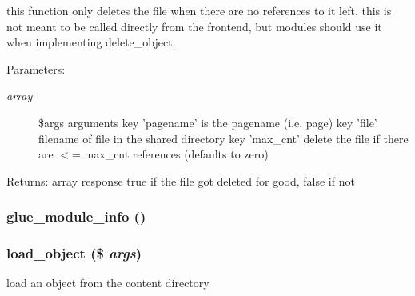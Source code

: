 this function only deletes the file when there are no references to it left. this is not meant to be called directly from the frontend, but modules should use it when implementing delete\_\-object. \begin{Desc}
\item[Parameters:]
\begin{description}
\item[{\em array}]\$args arguments key 'pagename' is the pagename (i.e. page) key 'file' filename of file in the shared directory key 'max\_\-cnt' delete the file if there are $<$= max\_\-cnt references (defaults to zero) \end{description}
\end{Desc}
\begin{Desc}
\item[Returns:]array response true if the file got deleted for good, false if not \end{Desc}
\hypertarget{module__glue_8inc_8php_9b741f04b878cbc03f1aac7d3406d548}{
\subsubsection[{glue\_\-module\_\-info}]{\setlength{\rightskip}{0pt plus 5cm}glue\_\-module\_\-info ()}}
\label{module__glue_8inc_8php_9b741f04b878cbc03f1aac7d3406d548}


\hypertarget{module__glue_8inc_8php_c6b5ed5ff055ccb4d07ad17cf78d5a11}{
\subsubsection[{load\_\-object}]{\setlength{\rightskip}{0pt plus 5cm}load\_\-object (\$ {\em args})}}
\label{module__glue_8inc_8php_c6b5ed5ff055ccb4d07ad17cf78d5a11}


load an object from the content directory

